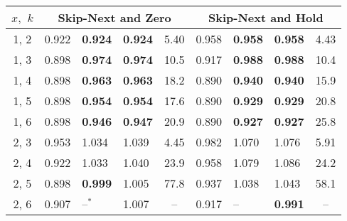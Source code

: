 \begin{tabular}{|c|clll|clll|}
\rowcolor{gray!15}
\hline
$x,$ $k$ & \multicolumn{4}{c|}{\textbf{Skip-Next and Zero}} & \multicolumn{4}{c|}{\textbf{Skip-Next and Hold}} \\
\hline
1, 2
& 0.922 &  \textbf{0.924} & \textbf{0.924} & 5.40
& 0.958 &  \textbf{0.958} & \textbf{0.958} & 4.43\\
\rowcolor{gray!15}
1, 3
& 0.898 & \textbf{0.974} & \textbf{0.974} & 10.5
& 0.917 & \textbf{0.988} & \textbf{0.988} & 10.4\\
1, 4
& 0.898 & \textbf{0.963} & \textbf{0.963} & 18.2
& 0.890 & \textbf{0.940} & \textbf{0.940} & 15.9\\
\rowcolor{gray!15}
1, 5
& 0.898 & \textbf{0.954} & \textbf{0.954} & 17.6
& 0.890 & \textbf{0.929} & \textbf{0.929} & 20.8\\
1, 6
& 0.898 & \textbf{0.946} & \textbf{0.947} & 20.9
& 0.890 & \textbf{0.927} & \textbf{0.927} & 25.8\\
\hline
\rowcolor{gray!15}
2, 3
& 0.953 & 1.034 & 1.039 & 4.45
& 0.982 & 1.070 & 1.076 & 5.91\\
2, 4
& 0.922 & 1.033 & 1.040 & 23.9
& 0.958 & 1.079 & 1.086 & 24.2\\
\rowcolor{gray!15}
2, 5
& 0.898 & \textbf{0.999} & 1.005 & 77.8
& 0.937 & 1.038 & 1.043 & 58.1\\
2, 6
& 0.907 &{--$\mathbf{^*}$} & 1.007 & \multicolumn{1}{c|}{--}
& 0.917 &{--} & \textbf{0.991} & \multicolumn{1}{c|}{--}\\
\hline

\end{tabular}
